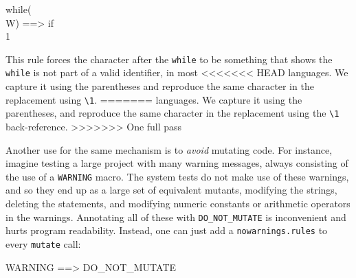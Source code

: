 \begin{code}
while(\\W) ==> if\\1 
\end{code}

\noindent This rule forces the character after the {\tt while} to be something
that shows the {\tt while} is not part of a valid identifier, in most
<<<<<<< HEAD
languages.  We capture it using the parentheses and reproduce the
same character in the replacement using {\tt \textbackslash1}.
=======
languages.  We capture it using the parentheses, and reproduce the
same character in the replacement using the {\tt \textbackslash1} back-reference.
>>>>>>> One full pass

Another use for the same mechanism is to \emph{avoid} mutating code.
For instance, imagine testing a large project with many warning
messages, always consisting of the use of a {\tt WARNING} macro.  The
system tests do not make use of these warnings, and so they end up as
a large set of equivalent mutants, modifying the strings, deleting the
statements, and modifying numeric constants or arithmetic operators in
the warnings.  Annotating all of these with {\tt DO\_NOT\_MUTATE} is
inconvenient and hurts program readability.  Instead, one can just add a
{\tt nowarnings.rules} to every {\tt mutate} call:

\begin{code}
WARNING ==> DO\_NOT\_MUTATE
\end{code}

